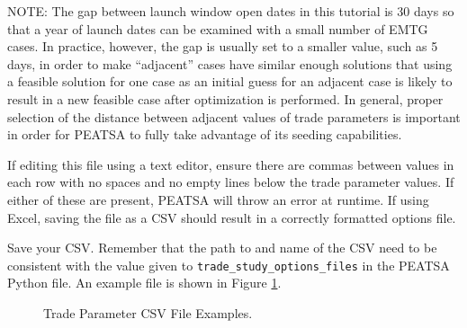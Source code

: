 \documentclass[11pt]{article}
\begin{document}
\noindent NOTE: The gap between launch window open dates in this tutorial is 30 days so that a year of launch dates can be examined with a small number of \ac{EMTG} cases. In practice, however, the gap is usually set to a smaller value, such as 5 days, in order to make ``adjacent'' cases have similar enough solutions that using a feasible solution for one case as an initial guess for an adjacent case is likely to result in a new feasible case after optimization is performed. In general, proper selection of the distance between adjacent values of trade parameters is important in order for \ac{PEATSA} to fully take advantage of its seeding capabilities.

\noindent If editing this file using a text editor, ensure there are commas between values in each row with no spaces and no empty lines below the trade parameter values. If either of these are present, \ac{PEATSA} will throw an error at runtime. If using Excel, saving the file as a CSV should result in a correctly formatted options file.

\noindent Save your CSV. Remember that the path to and name of the CSV need to be consistent with the value given to \texttt{trade\_study\_options\_files} in the \ac{PEATSA} Python file. An example file is shown in Figure \ref{fig:trade_param_file_ex}.

\begin{figure}
	\centering
	\caption{\label{fig:trade_param_file_ex}Trade Parameter CSV File Examples.}
\end{figure}
\end{document}
